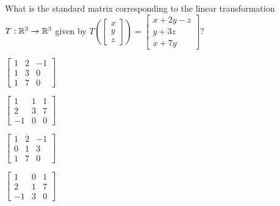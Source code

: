 \begin{readinessAssuranceTest}
\item What is the standard matrix corresponding to the linear transformation $T: \mathbb{R}^3 \rightarrow \mathbb{R}^3$ given by $T\left( \begin{bmatrix} x \\ y \\ z \end{bmatrix}\right) = \begin{bmatrix} x+2y-z \\ y+3z \\x+7y \end{bmatrix}$?
\begin{multicols}{4}
\begin{readinessAssuranceTestChoices}
\item $\begin{bmatrix} 1 & 2 & -1 \\ 1 & 3 & 0 \\ 1 & 7 & 0 \end{bmatrix}$
\item $\begin{bmatrix} 1 & 1 & 1 \\ 2 & 3 & 7 \\ -1 & 0 & 0 \end{bmatrix}$
\item $\begin{bmatrix} 1 & 2 & -1 \\ 0 & 1 & 3 \\ 1 & 7 & 0 \end{bmatrix}$ %
\item $\begin{bmatrix}  1 & 0 & 1 \\ 2 & 1 & 7 \\ -1 & 3 & 0 \end{bmatrix}$
\end{readinessAssuranceTestChoices}
\end{multicols}


\end{readinessAssuranceTest}

